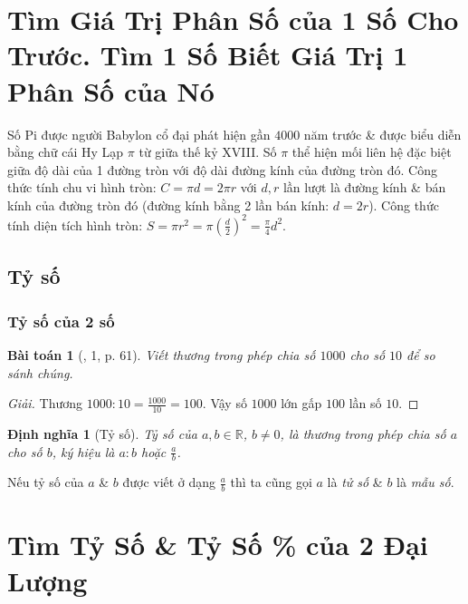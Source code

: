 \documentclass{article}
\newtheorem{baitoan}{Bài toán}
\newtheorem{dinhnghia}{Định nghĩa}
\begin{document}

\section{Tìm Giá Trị Phân Số của 1 Số Cho Trước. Tìm 1 Số Biết Giá Trị 1 Phân Số của Nó}
Số Pi được người Babylon cổ đại phát hiện gần $4000$ năm trước \& được biểu diễn bằng chữ cái Hy Lạp $\pi$ từ giữa thế kỷ XVIII. Số $\pi$ thể hiện mối liên hệ đặc biệt giữa độ dài của 1 đường tròn với độ dài đường kính của đường tròn đó. Công thức tính chu vi hình tròn: $C = \pi d = 2\pi r$ với $d,r$ lần lượt là đường kính \& bán kính của đường tròn đó (đường kính bằng 2 lần bán kính: $d = 2r$). Công thức tính diện tích hình tròn: $S = \pi r^2 = \pi\left(\frac{d}{2}\right)^2 = \frac{\pi}{4}d^2$.

\subsection{Tỷ số}

\subsubsection{Tỷ số của 2 số}

\begin{baitoan}[\cite{SGK_Toan_6_Canh_Dieu_tap_2}, 1, p. 61]
	Viết thương trong phép chia số $1000$ cho số $10$ để so sánh chúng.
\end{baitoan}

\begin{proof}[Giải]
	Thương $1000:10 = \frac{1000}{10} = 100$. Vậy số $1000$ lớn gấp $100$ lần số $10$.
\end{proof}

\begin{dinhnghia}[Tỷ số]
	\emph{Tỷ số} của $a,b\in\mathbb{R}$, $b\ne0$, là thương trong phép chia số $a$ cho số $b$, ký hiệu là $a:b$ hoặc $\frac{a}{b}$.
\end{dinhnghia}
Nếu tỷ số của $a$ \& $b$ được viết ở dạng $\frac{a}{b}$ thì ta cũng gọi $a$ là \textit{tử số} \& $b$ là \textit{mẫu số}.



\section{Tìm Tỷ Số \& Tỷ Số \% của 2 Đại Lượng}
\end{document}
